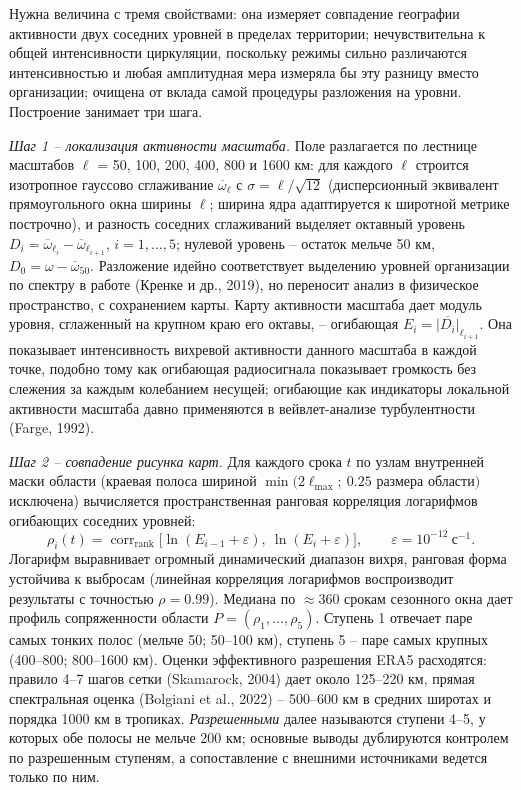 \documentclass[12pt,a4paper]{article}
\begin{document}
Нужна величина с тремя свойствами: она измеряет совпадение географии активности двух соседних уровней в пределах территории; нечувствительна к общей интенсивности циркуляции, поскольку режимы сильно различаются интенсивностью и любая амплитудная мера измеряла бы эту разницу вместо организации; очищена от вклада самой процедуры разложения на уровни. Построение занимает три шага.

\emph{Шаг 1 -- локализация активности масштаба.} Поле разлагается по лестнице масштабов $\ell$ = 50, 100, 200, 400, 800 и 1600 км: для каждого $\ell$ строится изотропное гауссово сглаживание $\overline{\omega}_\ell$ с $\sigma = \ell/\sqrt{12}$ (дисперсионный эквивалент прямоугольного окна ширины $\ell$; ширина ядра адаптируется к широтной метрике построчно), и разность соседних сглаживаний выделяет октавный уровень $D_i = \overline{\omega}_{\ell_i} - \overline{\omega}_{\ell_{i+1}}$, $i = 1, \dots, 5$; нулевой уровень -- остаток мельче 50 км, $D_0 = \omega - \overline{\omega}_{50}$. Разложение идейно соответствует выделению уровней организации по спектру в работе (Кренке и др., 2019), но переносит анализ в физическое пространство, с сохранением карты. Карту активности масштаба дает модуль уровня, сглаженный на крупном краю его октавы, -- огибающая $E_i = \overline{|D_i|}_{\ell_{i+1}}$. Она показывает интенсивность вихревой активности данного масштаба в каждой точке, подобно тому как огибающая радиосигнала показывает громкость без слежения за каждым колебанием несущей; огибающие как индикаторы локальной активности масштаба давно применяются в вейвлет-анализе турбулентности (Farge, 1992).

\emph{Шаг 2 -- совпадение рисунка карт.} Для каждого срока $t$ по узлам внутренней маски области (краевая полоса шириной $\min(2\ell_{\max};\ 0.25$ размера области$)$ исключена) вычисляется пространственная ранговая корреляция логарифмов огибающих соседних уровней:
\begin{equation}
\label{eq:rho}
\rho_i(t) = \operatorname{corr}_{\mathrm{rank}}\bigl[\ln(E_{i-1} + \varepsilon),\ \ln(E_i + \varepsilon)\bigr], \qquad \varepsilon = 10^{-12}\ \text{с}^{-1}.
\end{equation}
Логарифм выравнивает огромный динамический диапазон вихря, ранговая форма устойчива к выбросам (линейная корреляция логарифмов воспроизводит результаты с точностью $\rho = 0.99$). Медиана по $\approx$360 срокам сезонного окна дает профиль сопряженности области $P = (\rho_1, \dots, \rho_5)$. Ступень 1 отвечает паре самых тонких полос (мельче 50; 50--100 км), ступень 5 -- паре самых крупных (400--800; 800--1600 км). Оценки эффективного разрешения ERA5 расходятся: правило 4--7 шагов сетки (Skamarock, 2004) дает около 125--220 км, прямая спектральная оценка (Bolgiani et al., 2022) -- 500--600 км в средних широтах и порядка 1000 км в тропиках. \emph{Разрешенными} далее называются ступени 4--5, у которых обе полосы не мельче 200 км; основные выводы дублируются контролем по разрешенным ступеням, а сопоставление с внешними источниками ведется только по ним.
\end{document}
